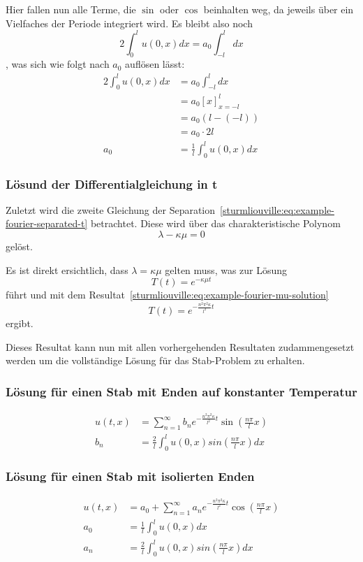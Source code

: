 Hier fallen nun alle Terme, die $\sin$ oder $\cos$ beinhalten weg, da jeweils
über ein Vielfaches der Periode integriert wird.
Es bleibt also noch
\[
    2\int_{0}^{l}u(0, x)dx
    =
    a_0 \int_{-l}^{l}dx
\]
, was sich wie folgt nach $a_0$ auflösen lässt:
\[
\begin{aligned}
    2\int_{0}^{l}u(0, x)dx
    &=
    a_0 \int_{-l}^{l}dx
    \\
    &=
    a_0 \left[x\right]_{x=-l}^{l}
    \\
    &=
    a_0(l - (-l))
    \\
    &=
    a_0 \cdot 2l
    \\
    a_0
    &=
    \frac{1}{l} \int_{0}^{l}u(0, x)dx
\end{aligned}
\]

%
%

\subsubsection{Lösund der Differentialgleichung in t}
Zuletzt wird die zweite Gleichung der 
Separation~\eqref{sturmliouville:eq:example-fourier-separated-t} betrachtet.
Diese wird über das charakteristische Polynom
\[
    \lambda - \kappa \mu
    =
    0
\]
gelöst.

Es ist direkt ersichtlich, dass $\lambda = \kappa \mu$ gelten muss, was zur
Lösung
\[
    T(t)
    =
    e^{-\kappa \mu t}
\]
führt und mit dem Resultat~\eqref{sturmliouville:eq:example-fourier-mu-solution}
\[
    T(t)
    =
    e^{-\frac{n^{2}\pi^{2}\kappa}{l^{2}}t}
\]
ergibt.

Dieses Resultat kann nun mit allen vorhergehenden Resultaten zudammengesetzt
werden um die vollständige Lösung für das Stab-Problem zu erhalten.

\subsubsection{Lösung für einen Stab mit Enden auf konstanter Temperatur}
\[
\begin{aligned}
    u(t,x)
    &=
    \sum_{n=1}^{\infty}b_{n}e^{-\frac{n^{2}\pi^{2}\kappa}{l^{2}}t}
    \sin\left(\frac{n\pi}{l}x\right)
    \\
    b_{n}
    &=
    \frac{2}{l}\int_{0}^{l}u(0,x)sin\left(\frac{n\pi}{l}x\right) dx
\end{aligned}
\]

\subsubsection{Lösung für einen Stab mit isolierten Enden}
\[
\begin{aligned}
    u(t,x)
    &=
    a_{0} + \sum_{n=1}^{\infty}a_{n}e^{-\frac{n^{2}\pi^{2}\kappa}{l^{2}}t}
    \cos\left(\frac{n\pi}{l}x\right)
    \\
    a_{0}
    &=
    \frac{1}{l}\int_{0}^{l}u(0,x) dx
    \\
    a_{n}
    &=
    \frac{2}{l}\int_{0}^{l}u(0,x)sin\left(\frac{n\pi}{l}x\right) dx
\end{aligned}
\]

